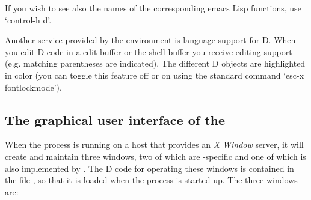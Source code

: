 If you wish to see also the names of the corresponding emacs Lisp
functions, use `control-h d'.

Another service provided by the  environment is language
support for D. When you edit D code in a edit buffer or the shell
buffer you receive editing support (e.g. matching parentheses are
indicated). The different D objects are highlighted in color (you can
toggle this feature off or on using the standard  command
`esc-x fontlockmode').

\subsection{The graphical user interface of the  }

When the  process is running on a host that provides an
\emph{X Window} server, it will create and maintain three windows, two
of which are -specific and one of which is also implemented
by . The D code for operating these windows is
contained in the file , so that it is loaded when
the  process is started up. The three windows are:

